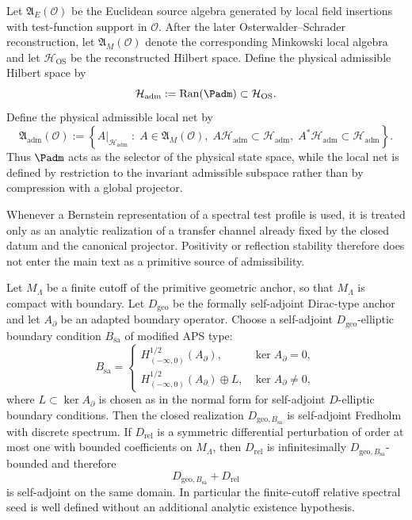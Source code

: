 \begin{definition}
\label{def:physical-admissible-local-net}
Let $\mathfrak A_E(\mathcal O)$ be the Euclidean source algebra generated by local field insertions
with test-function support in $\mathcal O$. After the later Osterwalder--Schrader reconstruction,
let $\mathfrak A_M(\mathcal O)$ denote the corresponding Minkowski local algebra and let
$\mathcal H_{\mathrm{OS}}$ be the reconstructed Hilbert space. Define the physical admissible
Hilbert space by
\[
\mathcal H_{\mathrm{adm}}:=\operatorname{Ran}(\Padm)\subset \mathcal H_{\mathrm{OS}}.
\]
Define the physical admissible local net by
\[
\mathfrak A_{\mathrm{adm}}(\mathcal O)
:=
\left\{
A|_{\mathcal H_{\mathrm{adm}}}\;:\;
A\in\mathfrak A_M(\mathcal O),\;
A\mathcal H_{\mathrm{adm}}\subset \mathcal H_{\mathrm{adm}},\;
A^\ast\mathcal H_{\mathrm{adm}}\subset \mathcal H_{\mathrm{adm}}
\right\}.
\]
Thus $\Padm$ acts as the selector of the physical state space, while the local net is defined by
restriction to the invariant admissible subspace rather than by compression with a global
projector.
\end{definition}

\begin{remark}
\label{ass:bernstein-positivity}
Whenever a Bernstein representation of a spectral test profile is used, it is treated only as an
analytic realization of a transfer channel already fixed by the closed datum and the canonical
projector. Positivity or reflection stability therefore does not enter the main text as a
primitive source of admissibility.
\end{remark}

\begin{theorem}
\label{thm:well-posed-primitive-dynamics}
\label{thm:primitive-selfadjoint-realization}
Let $M_\Lambda$ be a finite cutoff of the primitive geometric anchor, so that $M_\Lambda$ is
compact with boundary. Let $D_{\mathrm{geo}}$ be the formally self-adjoint Dirac-type anchor and
let $A_\partial$ be an adapted boundary operator. Choose a self-adjoint $D_{\mathrm{geo}}$-elliptic
boundary condition $B_{\mathrm{sa}}$ of modified APS type:
\[
B_{\mathrm{sa}}=
\begin{cases}
H^{1/2}_{(-\infty,0)}(A_\partial), & \ker A_\partial=0,\\[2mm]
H^{1/2}_{(-\infty,0)}(A_\partial)\oplus L, & \ker A_\partial\neq0,
\end{cases}
\]
where $L\subset\ker A_\partial$ is chosen as in the normal form for self-adjoint $D$-elliptic
boundary conditions. Then the closed realization $D_{\mathrm{geo},B_{\mathrm{sa}}}$ is self-adjoint
Fredholm with discrete spectrum. If $D_{\mathrm{rel}}$ is a symmetric differential perturbation of
order at most one with bounded coefficients on $M_\Lambda$, then $D_{\mathrm{rel}}$ is
infinitesimally $D_{\mathrm{geo},B_{\mathrm{sa}}}$-bounded and therefore
\[
D_{\mathrm{geo},B_{\mathrm{sa}}}+D_{\mathrm{rel}}
\]
is self-adjoint on the same domain. In particular the finite-cutoff relative spectral seed is well
defined without an additional analytic existence hypothesis.
\end{theorem}
